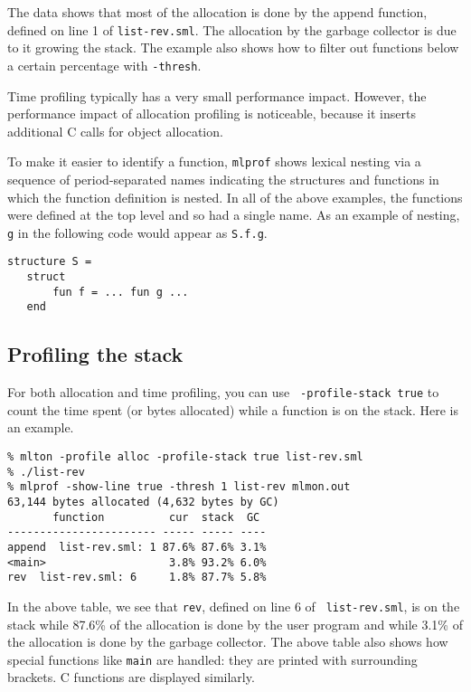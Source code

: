 The data shows that most of the allocation is done by the append
function, defined on line 1 of {\tt list-rev.sml}.  The allocation by
the garbage collector is due to it growing the stack.
The example
also shows how to filter out functions below a certain percentage with
{\tt -thresh}.

Time profiling typically has a very small performance impact.
However, the performance impact of allocation profiling is noticeable,
because it inserts additional C calls for object allocation.

To make it easier to identify a function, {\tt mlprof} shows lexical
nesting via a sequence of period-separated names indicating the
structures and functions in which the function definition is nested.
In all of the above examples, the functions were defined at the top
level and so had a single name.  As an example of nesting, {\tt g} in
the following code would appear as {\tt S.f.g}.
\begin{verbatim}
structure S =
   struct
       fun f = ... fun g ...
   end
\end{verbatim}

\subsection{Profiling the stack}

For both allocation and time profiling, you can use {\tt
-profile-stack true} to count the time spent (or bytes allocated)
while a function is on the stack.  Here is an example.

\begin{verbatim}
% mlton -profile alloc -profile-stack true list-rev.sml
% ./list-rev
% mlprof -show-line true -thresh 1 list-rev mlmon.out
63,144 bytes allocated (4,632 bytes by GC)
       function          cur  stack  GC 
----------------------- ----- ----- ----
append  list-rev.sml: 1 87.6% 87.6% 3.1%
<main>                   3.8% 93.2% 6.0%
rev  list-rev.sml: 6     1.8% 87.7% 5.8%
\end{verbatim}

In the above table, we see that {\tt rev}, defined on line 6 of {\tt
list-rev.sml}, is on the stack while 87.6\% of the allocation is done
by the user program and while 3.1\% of the allocation is done by the
garbage collector.  The above table also shows how special functions
like {\tt main} are handled: they are printed with surrounding
brackets.  C functions are displayed similarly.

